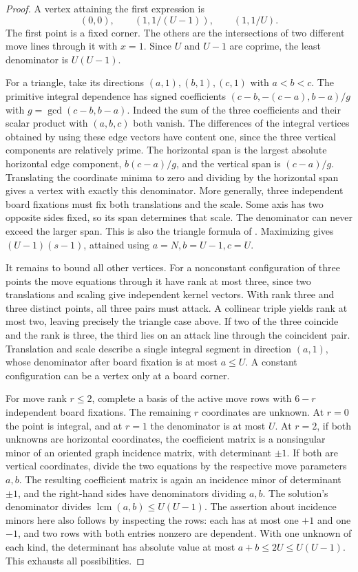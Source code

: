 \documentclass[11pt]{article}
\begin{document}
\begin{proof}
A vertex attaining the first expression is
\[
       (0,0),\qquad (1,1/(U-1)),\qquad(1,1/U).
\]
The first point is a fixed corner. The others are the intersections of two different move lines through it with $x=1$. Since $U$ and $U-1$ are coprime, the least denominator is $U(U-1)$.

For a triangle, take its directions $(a,1),(b,1),(c,1)$ with $a<b<c$. The primitive integral dependence has signed coefficients $(c-b,-(c-a),b-a)/g$ with $g=\gcd(c-b,b-a)$. Indeed the sum of the three coefficients and their scalar product with $(a,b,c)$ both vanish. The differences of the integral vertices obtained by using these edge vectors have content one, since the three vertical components are relatively prime. The horizontal span is the largest absolute horizontal edge component, $b(c-a)/g$, and the vertical span is $(c-a)/g$. Translating the coordinate minima to zero and dividing by the horizontal span gives a vertex with exactly this denominator. More generally, three independent board fixations must fix both translations and the scale. Some axis has two opposite sides fixed, so its span determines that scale. The denominator can never exceed the larger span. This is also the triangle formula of \cite[Prop.~5.1]{chz}. Maximizing gives $(U-1)(s-1)$, attained using $a=N,b=U-1,c=U$.

It remains to bound all other vertices. For a nonconstant configuration of three points the move equations through it have rank at most three, since two translations and scaling give independent kernel vectors. With rank three and three distinct points, all three pairs must attack. A collinear triple yields rank at most two, leaving precisely the triangle case above. If two of the three coincide and the rank is three, the third lies on an attack line through the coincident pair. Translation and scale describe a single integral segment in direction $(a,1)$, whose denominator after board fixation is at most $a\le U$. A constant configuration can be a vertex only at a board corner.

For move rank $r\le2$, complete a basis of the active move rows with $6-r$ independent board fixations. The remaining $r$ coordinates are unknown. At $r=0$ the point is integral, and at $r=1$ the denominator is at most $U$. At $r=2$, if both unknowns are horizontal coordinates, the coefficient matrix is a nonsingular minor of an oriented graph incidence matrix, with determinant $\pm1$. If both are vertical coordinates, divide the two equations by the respective move parameters $a,b$. The resulting coefficient matrix is again an incidence minor of determinant $\pm1$, and the right-hand sides have denominators dividing $a,b$. The solution's denominator divides $\operatorname{lcm}(a,b)\le U(U-1)$. The assertion about incidence minors here also follows by inspecting the rows: each has at most one $+1$ and one $-1$, and two rows with both entries nonzero are dependent. With one unknown of each kind, the determinant has absolute value at most $a+b\le2U\le U(U-1)$. This exhausts all possibilities.
\end{proof}
\end{document}

